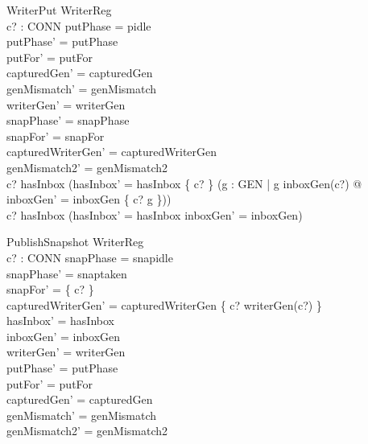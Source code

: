 \documentclass[a4paper,10pt,fleqn]{article}
\begin{document}
\begin{schema}{WriterPut}
  \Delta WriterReg \\
  c? : CONN
\where
  putPhase = pidle \\
  putPhase' = putPhase \\
  putFor' = putFor \\
  capturedGen' = capturedGen \\
  genMismatch' = genMismatch \\
  writerGen' = writerGen \\
  snapPhase' = snapPhase \\
  snapFor' = snapFor \\
  capturedWriterGen' = capturedWriterGen \\
  genMismatch2' = genMismatch2 \\
  c? \notin hasInbox \implies
    (hasInbox' = hasInbox \cup \{ c? \} \land
     (\exists g : GEN | g \neq inboxGen(c?) @
       inboxGen' = inboxGen \oplus \{ c? \mapsto g \})) \\
  c? \in hasInbox \implies
    (hasInbox' = hasInbox \land inboxGen' = inboxGen)
\end{schema}


\begin{schema}{PublishSnapshot}
  \Delta WriterReg \\
  c? : CONN
\where
  snapPhase = snapidle \\
  snapPhase' = snaptaken \\
  snapFor' = \{ c? \} \\
  capturedWriterGen' = capturedWriterGen \oplus \{ c? \mapsto writerGen(c?) \} \\
  hasInbox' = hasInbox \\
  inboxGen' = inboxGen \\
  writerGen' = writerGen \\
  putPhase' = putPhase \\
  putFor' = putFor \\
  capturedGen' = capturedGen \\
  genMismatch' = genMismatch \\
  genMismatch2' = genMismatch2
\end{schema}
\end{document}
